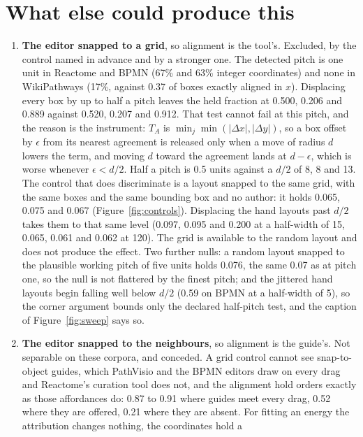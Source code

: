 \documentclass[11pt]{article}
\begin{document}
\section{What else could produce this}\label{sec:alternatives}




\begin{enumerate}
\item \textbf{The editor snapped to a grid}, so alignment is the tool's. Excluded, by the
  control named in advance and by a stronger one. The detected pitch
  is one unit in Reactome and BPMN (67\% and 63\% integer coordinates) and none in
  WikiPathways (17\%, against 0.37 of boxes exactly aligned in $x$). Displacing every box
  by up to half a pitch leaves the held fraction at 0.500, 0.206 and 0.889 against 0.520,
  0.207 and 0.912. That test cannot fail at this pitch, and the reason is the instrument:
  $T_A$ is $\min_j\min(|\Delta x|,|\Delta y|)$, so a box offset by $\epsilon$ from its
  nearest agreement is released only when a move of radius $d$ lowers the term, and moving
  $d$ toward the agreement lands at $d-\epsilon$, which is worse whenever $\epsilon < d/2$.
  Half a pitch is 0.5 units against a $d/2$ of 8, 8 and 13. The control that does
  discriminate is a layout snapped to the same grid, with the same boxes and the same
  bounding box and no author: it holds 0.065, 0.075 and 0.067
  (Figure~\ref{fig:controls}). Displacing the hand layouts
  past $d/2$ takes them to that same level (0.097, 0.095 and 0.200 at a half-width of 15,
  0.065, 0.061 and 0.062 at 120). The grid is available to the random layout and does not
  produce the effect. Two further nulls: a random layout snapped to the
  plausible working pitch of five units holds 0.076, the same 0.07 as at pitch one, so
  the null is not flattered by the finest pitch; and the jittered hand layouts begin
  falling well below $d/2$ (0.59 on BPMN at a half-width of 5), so the corner argument
  bounds only the declared half-pitch test, and the caption of Figure~\ref{fig:sweep}
  says so.
\item \textbf{The editor snapped to the neighbours}, so alignment is the guide's. Not
  separable on these corpora, and conceded. A grid control cannot see snap-to-object
  guides, which PathVisio and the BPMN editors draw on every drag and Reactome's curation
  tool does not, and the alignment hold orders exactly as those affordances do: 0.87 to
  0.91 where guides meet every drag, 0.52 where they are offered, 0.21 where they are
  absent. For fitting an energy the attribution changes nothing, the coordinates hold a

\end{enumerate}
\end{document}
